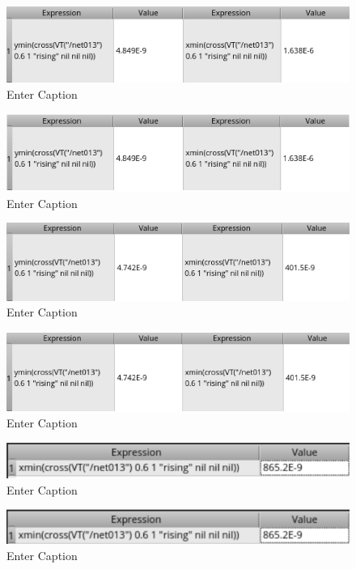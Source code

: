 \documentclass[12pt]{article}
\begin{document}
\begin{figure}[H]
    \centering
    \includegraphics[width=0.5\linewidth]{writeup//figures/optimized_wmux_value.png}
    \caption{Enter Caption}
\end{figure}

\begin{figure}[H]
    \centering
    \includegraphics[width=0.5\linewidth]{writeup//figures/wmux1.png}
    \caption{Enter Caption}
\end{figure}

\begin{figure}[H]
    \centering
    \includegraphics[width=0.5\linewidth]{writeup//figures/optimized_wbuf_value.png}
    \caption{Enter Caption}
\end{figure}

\begin{figure}[H]
    \centering
    \includegraphics[width=0.5\linewidth]{writeup//figures/wbuf1.png}
    \caption{Enter Caption}
\end{figure}

\begin{figure}[H]
    \centering
    \includegraphics[width=0.5\linewidth]{writeup//figures/optimized_wmux_value2.png}
    \caption{Enter Caption}
\end{figure}

\begin{figure}[H]
    \centering
    \includegraphics[width=0.5\linewidth]{writeup//figures/wmux2.png}
    \caption{Enter Caption}
\end{figure}
\end{document}
